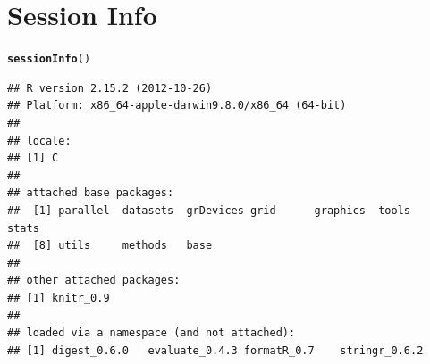\documentclass[12pt]{article}\usepackage{graphicx, color}
\makeatletter
\newcommand{\hlfunctioncall}[1]{\textcolor[rgb]{0.501960784313725,0,0.329411764705882}{\textbf{#1}}}%
\newenvironment{kframe}{%
 \def\at@end@of@kframe{}%
 \ifinner\ifhmode%
  \def\at@end@of@kframe{\end{minipage}}%
  \begin{minipage}{\columnwidth}%
 \fi\fi%
 \def\FrameCommand##1{\hskip\@totalleftmargin \hskip-\fboxsep
 \colorbox{shadecolor}{##1}\hskip-\fboxsep
     \hskip-\linewidth \hskip-\@totalleftmargin \hskip\columnwidth}%
 \MakeFramed {\advance\hsize-\width
   \@totalleftmargin\z@ \linewidth\hsize
   \@setminipage}}%
 {\par\unskip\endMakeFramed%
 \at@end@of@kframe}
\newenvironment{knitrout}{}{} %
\makeatother
\begin{document}


\section{Session Info}
\begin{knitrout}
\color{fgcolor}\begin{kframe}
\begin{alltt}
\hlfunctioncall{sessionInfo}()
\end{alltt}
\begin{verbatim}
## R version 2.15.2 (2012-10-26)
## Platform: x86_64-apple-darwin9.8.0/x86_64 (64-bit)
## 
## locale:
## [1] C
## 
## attached base packages:
##  [1] parallel  datasets  grDevices grid      graphics  tools     stats    
##  [8] utils     methods   base     
## 
## other attached packages:
## [1] knitr_0.9
## 
## loaded via a namespace (and not attached):
## [1] digest_0.6.0   evaluate_0.4.3 formatR_0.7    stringr_0.6.2
\end{verbatim}
\end{kframe}
\end{knitrout}





\printindex
\end{document}

